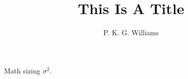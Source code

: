 \documentclass{article}
\title{This Is A Title}
\author{P. K. G. Williams}
\begin{document}
Math sizing $\sigma^2$.
\end{document}
